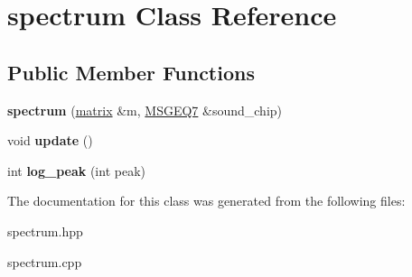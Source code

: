 \hypertarget{classspectrum}{}\section{spectrum Class Reference}
\label{classspectrum}
\subsection*{Public Member Functions}
\begin{DoxyCompactItemize}
\item 
\mbox{\label{classspectrum_a6759a96ad6dccedf56bca37bb4a87d51}} 
{\bfseries spectrum} (\mbox{\hyperlink{classmatrix}{matrix}} \&m, \mbox{\hyperlink{class_m_s_g_e_q7}{M\+S\+G\+E\+Q7}} \&sound\+\_\+chip)
\item 
\mbox{\label{classspectrum_afe3ee6d90cf2fe940bf94691545eb1c2}} 
void {\bfseries update} ()
\item 
\mbox{\label{classspectrum_a0b11b27411c429786e8ad89c23a8aabe}} 
int {\bfseries log\+\_\+peak} (int peak)
\end{DoxyCompactItemize}


The documentation for this class was generated from the following files\+:\begin{DoxyCompactItemize}
\item 
spectrum.\+hpp\item 
spectrum.\+cpp\end{DoxyCompactItemize}
